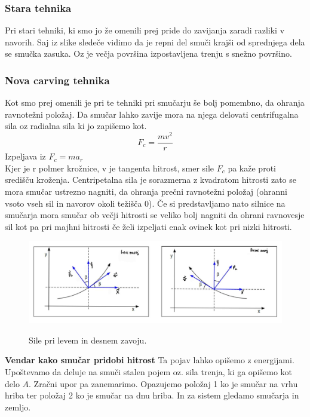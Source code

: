\documentclass{article}
\begin{document}
\subsubsection*{Stara tehnika}
Pri stari tehniki, ki smo jo že omenili prej pride do zavijanja zaradi razliki v navorih. Saj iz slike sledeče vidimo
da je repni del smuči krajši od sprednjega dela se smučka zasuka. Oz je večja površina izpostavljena trenju s snežno površino.
\subsubsection*{Nova carving tehnika}
Kot smo prej omenili je pri te tehniki pri smučarju še bolj pomembno, da ohranja ravnotežni položaj. Da smučar lahko zavije mora na njega delovati
centrifugalna sila oz radialna sila ki jo zapišemo kot.
\[F_c=\frac{mv^2}{r}\]
Izpeljava iz $ F_c=ma_r $ \\ \newline
Kjer je r polmer krožnice, v je tangenta hitrost, smer sile $ F_c $ pa kaže proti središču kroženja. Centripetalna sila je sorazmerna z kvadratom hitrosti
zato se mora smučar ustrezno nagniti, da ohranja prečni ravnotežni položaj (ohranni vsoto vseh sil in navorov okoli težišča 0).
Če si predstavljamo nato silnice na smučarja mora smučar ob večji hitrosti se veliko bolj nagniti da ohrani ravnovesje sil kot pa pri majhni hitrosti 
če želi izpeljati enak ovinek kot pri nizki hitrosti.\\ \newline 

\begin{figure}
    \centering
    \includegraphics[scale=0.3]{../images/neke silo ovo ono.jpg} \\
    \caption[short]{Sile pri levem in desnem zavoju.}
\end{figure}

\textbf{Vendar kako smučar pridobi hitrost}
Ta pojav lahko opišemo z energijami. Upoštevamo da deluje na smuči stalen pojem oz. sila trenja, ki ga opišemo kot delo $ A $. Zračni upor pa zanemarimo.\newline
Opazujemo položaj 1 ko je smučar na vrhu hriba ter položaj 2 ko je smučar na dnu hriba. In za sistem gledamo smučarja in zemljo.
\end{document}
